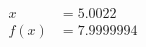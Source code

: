 \documentclass[preview]{standalone}
\begin{document}
\begin{align*}
x &= 5.0022\\f(x) &= 7.9999994
\end{align*}
\end{document}
